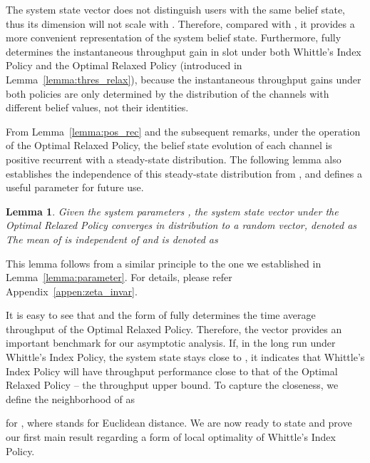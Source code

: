 \documentclass[11pt,twocolumn]{IEEEtran}
\newtheorem{lemma}{Lemma}
\begin{document}
The system state vector  does not distinguish
users with the same belief state, thus its dimension will not scale
with . Therefore, compared with , it provides a
more convenient representation of the system belief state.
Furthermore,  fully determines the instantaneous
throughput gain in slot  under both Whittle's Index Policy
and the Optimal Relaxed Policy (introduced in
Lemma~\ref{lemma:thres_relax}), because the instantaneous
throughput gains under both policies are only determined by the
distribution of the channels with different belief values, not their
identities.



From Lemma~\ref{lemma:pos_rec} and the subsequent remarks,
under the operation of the Optimal Relaxed Policy, the belief state
evolution of each channel is positive recurrent with a steady-state
distribution. The following lemma also establishes the independence
of this steady-state distribution from , and defines a useful
parameter for future use.







\begin{lemma}\label{lemma:zeta_invar}
Given the system parameters , the system state
vector  under the Optimal Relaxed Policy converges
in distribution to a random vector, denoted as  The mean of  is
independent of  and is denoted as

\vspace{-18pt}

\end{lemma}

 This lemma follows from a similar
principle to the one we established in Lemma~\ref{lemma:parameter}.
For details, please refer Appendix~\ref{appen:zeta_invar}.
\hspace{2in} 

It is easy to see that  and the form of 
fully determines the time average throughput of the Optimal Relaxed
Policy. Therefore, the vector  provides an important benchmark for our asymptotic
analysis. If, in the long run under Whittle's Index Policy, the system state  stays close to
, it indicates that Whittle's Index Policy will have throughput performance close to
that of the Optimal Relaxed Policy -- the throughput upper bound. To
capture the closeness, we define the  neighborhood of
 as

for , where  stands for Euclidean distance. We
are now ready to state and prove our first main result regarding a
form of local optimality of Whittle's Index Policy.
\end{document}
